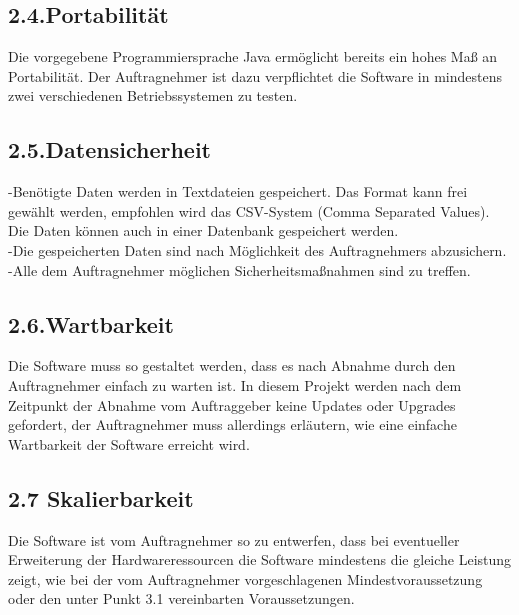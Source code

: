 \documentclass[12pt]{article}
\renewcommand{\_}{\kern-1.5pt\textunderscore\kern-1.5pt}
\begin{document}
\subsection{2.4.\hspace*{10pt}Portabilität}
Die vorgegebene Programmiersprache Java ermöglicht bereits ein hohes Maß an Portabilität. Der Auftragnehmer ist dazu verpflichtet die Software in mindestens zwei verschiedenen Betriebssystemen zu testen. 
\subsection{2.5.\hspace*{10pt}Datensicherheit}
-\tab Benötigte Daten werden in Textdateien gespeichert. Das Format kann frei gewählt werden, \tab empfohlen wird das CSV-System (Comma Separated Values). Die Daten können auch in einer \tab Datenbank gespeichert werden.\\
-\tab Die gespeicherten Daten sind nach Möglichkeit des Auftragnehmers abzusichern.\\
-\tab Alle dem Auftragnehmer möglichen Sicherheitsmaßnahmen sind zu treffen.
\subsection{2.6.\hspace*{10pt}Wartbarkeit}
Die Software muss so gestaltet werden, dass es nach Abnahme durch den Auftragnehmer einfach zu warten ist. In diesem Projekt werden nach dem Zeitpunkt der Abnahme vom Auftraggeber keine Updates oder Upgrades gefordert, der Auftragnehmer muss allerdings erläutern, wie eine einfache Wartbarkeit der Software erreicht wird.
\subsection{2.7 Skalierbarkeit}
Die Software ist vom Auftragnehmer so zu entwerfen, dass bei eventueller Erweiterung der Hardwareressourcen die Software mindestens die gleiche Leistung zeigt, wie bei der vom Auftragnehmer vorgeschlagenen Mindestvoraussetzung oder den unter Punkt 3.1 vereinbarten Voraussetzungen.

\vspace{\baselineskip}

\vspace{\baselineskip}

\vspace{\baselineskip}

\vspace{\baselineskip}
\end{document}
